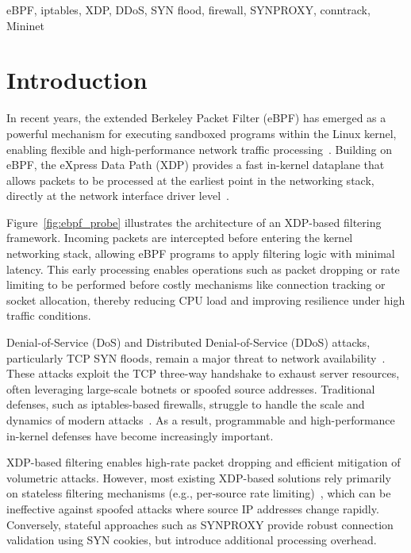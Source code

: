 \documentclass[conference]{IEEEtran}
\begin{document}
\begin{IEEEkeywords}
eBPF, iptables, XDP, DDoS, SYN flood, firewall, SYNPROXY, conntrack,
Mininet
\end{IEEEkeywords}

\section{Introduction}

In recent years, the extended Berkeley Packet Filter (eBPF) has emerged as
a powerful mechanism for executing sandboxed programs within the Linux
kernel, enabling flexible and high-performance network traffic
processing~\cite{ebpf}.
Building on eBPF, the eXpress Data Path (XDP) provides a fast in-kernel
dataplane that allows packets to be processed at the earliest point in the
networking stack, directly at the network interface driver
level~\cite{HighPerfXDP}.

Figure~\ref{fig:ebpf_probe} illustrates the architecture of an XDP-based
filtering framework.
Incoming packets are intercepted before entering the kernel networking
stack, allowing eBPF programs to apply filtering logic with minimal latency.
This early processing enables operations such as packet dropping or rate
limiting to be performed before costly mechanisms like connection tracking
or socket allocation, thereby reducing CPU load and improving resilience
under high traffic conditions.

Denial-of-Service (DoS) and Distributed Denial-of-Service (DDoS) attacks,
particularly TCP SYN floods, remain a major threat to network
availability~\cite{TahirPaper}.
These attacks exploit the TCP three-way handshake to exhaust server
resources, often leveraging large-scale botnets or spoofed source addresses.
Traditional defenses, such as iptables-based firewalls, struggle to handle
the scale and dynamics of modern attacks~\cite{applsci13}.
As a result, programmable and high-performance in-kernel defenses have
become increasingly important.

XDP-based filtering enables high-rate packet dropping and efficient
mitigation of volumetric attacks.
However, most existing XDP-based solutions rely primarily on stateless
filtering mechanisms (e.g., per-source rate
limiting)~\cite{HighPerfXDP}, which can be ineffective against spoofed
attacks where source IP addresses change rapidly.
Conversely, stateful approaches such as SYNPROXY provide robust connection
validation using SYN cookies, but introduce additional processing overhead.
\end{document}
